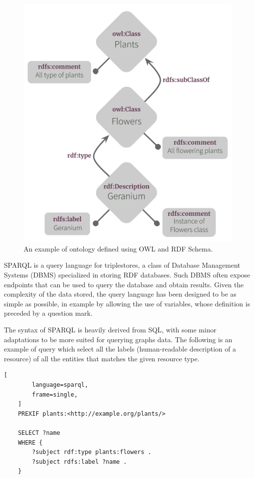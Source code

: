 \documentclass[%
    corpo=13.5pt,
    twoside,
    oldstyle,
    tipotesi=magistrale,
    greek,
    evenboxes
]{toptesi}
\begin{document}
\begin{figure}[ht]
\centering
\includegraphics[scale=0.6]{img/owl-ontology-example.png}
\caption{An example of ontology defined using OWL and RDF Schema.}
\label{fig:owl-ontology-example} %
\end{figure}

SPARQL is a query language for triplestores, a class of Database
Management Systems (DBMS) specialized in storing RDF databases. Such DBMS
often expose endpoints that can be used to query the database and obtain
results. Given the complexity of the data stored, the query language has
been designed to be as simple as possible, in example by allowing the use
of variables, whose definition is preceded by a question mark.

The syntax of SPARQL is heavily derived from SQL, with some
minor adaptations to be more suited for querying graphs data. The
following is an example of query which select all the labels
(human-readable description of a resource) of all the entities that
matches the given resource type.

\begin{lstlisting}[
        language=sparql,
        frame=single,
    ]
    PREXIF plants:<http://example.org/plants/>

    SELECT ?name
    WHERE {
        ?subject rdf:type plants:flowers .
        ?subject rdfs:label ?name .
    }
\end{lstlisting}
\end{document}
